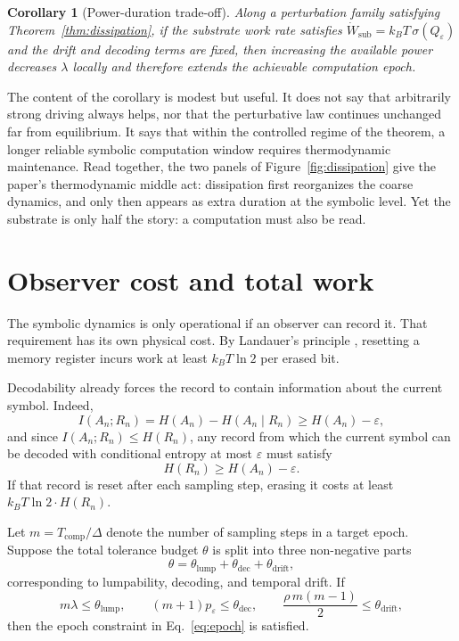 \documentclass[11pt,a4paper]{article}
\newtheorem{corollary}{Corollary}
\theoremstyle{definition}
\theoremstyle{remark}
\newcommand{\Tc}{T_{\mathrm{comp}}}
\newcommand{\Eqref}[1]{Eq.~\eqref{#1}}
\begin{document}
\begin{corollary}[Power-duration trade-off]\label{cor:power}
Along a perturbation family satisfying Theorem~\ref{thm:dissipation}, if the substrate work rate satisfies $\dot{W}_{\mathrm{sub}} = k_BT\,\sigma(Q_\varepsilon)$ and the drift and decoding terms are fixed, then increasing the available power decreases $\lambda$ locally and therefore extends the achievable computation epoch.
\end{corollary}

The content of the corollary is modest but useful. It does not say that arbitrarily strong driving always helps, nor that the perturbative law continues unchanged far from equilibrium. It says that within the controlled regime of the theorem, a longer reliable symbolic computation window requires thermodynamic maintenance. Read together, the two panels of Figure~\ref{fig:dissipation} give the paper's thermodynamic middle act: dissipation first reorganizes the coarse dynamics, and only then appears as extra duration at the symbolic level. Yet the substrate is only half the story: a computation must also be read.

\section{Observer cost and total work}\label{sec:observer}

The symbolic dynamics is only operational if an observer can record it. That requirement has its own physical cost. By Landauer's principle \citep{landauer1961,bennett1982}, resetting a memory register incurs work at least $k_BT\ln 2$ per erased bit.

Decodability already forces the record to contain information about the current symbol. Indeed,
\[
I(A_n;R_n) = H(A_n)-H(A_n\mid R_n) \geq H(A_n)-\varepsilon,
\]
and since $I(A_n;R_n)\leq H(R_n)$, any record from which the current symbol can be decoded with conditional entropy at most $\varepsilon$ must satisfy
\[
H(R_n)\geq H(A_n)-\varepsilon.
\]
If that record is reset after each sampling step, erasing it costs at least $k_BT\ln 2 \cdot H(R_n)$.

Let $m = \Tc/\Delta$ denote the number of sampling steps in a target epoch. Suppose the total tolerance budget $\theta$ is split into three non-negative parts
\[
\theta = \theta_{\mathrm{lump}} + \theta_{\mathrm{dec}} + \theta_{\mathrm{drift}},
\]
corresponding to lumpability, decoding, and temporal drift. If
\[
m\lambda \leq \theta_{\mathrm{lump}}, \qquad
(m+1)p_\varepsilon \leq \theta_{\mathrm{dec}}, \qquad
\frac{\rho\,m(m-1)}{2} \leq \theta_{\mathrm{drift}},
\]
then the epoch constraint in \Eqref{eq:epoch} is satisfied.
\end{document}
